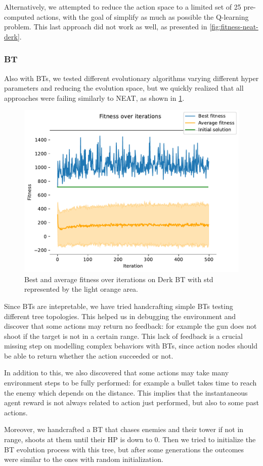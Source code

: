 Alternatively, we attempted to reduce the action space to a limited set of 25 pre-computed actions, with the goal of simplify as much as possible the Q-learning problem. This last approach did not work as well, as presented in \cref{fig:fitness-neat-derk}.


\subsubsection{BT}
Also with BTs, we tested different evolutionary algorithms varying different hyper parameters and reducing the evolution space, but we quickly realized that all approaches were failing similarly to NEAT, as shown in \cref{fig:fitness-bt-derk}.

\begin{figure}
    \centering
    \includegraphics[width=0.8\linewidth]{./images/fitness_over_iterations_derk_bt.pdf}
    \caption{Best and average fitness over iterations on Derk BT with std represented by the light orange area.}
    \label{fig:fitness-bt-derk}
\end{figure}

Since BTs are intepretable, we have tried handcrafting simple BTs testing different tree topologies. This helped us in debugging the environment and discover that some actions may return no feedback: for example the gun does not shoot if the target is not in a certain range. This lack of feedback is a crucial missing step on modelling complex behaviors with BTs, since action nodes should be able to return whether the action succeeded or not.

In addition to this, we also discovered that some actions may take many environment steps to be fully performed: for example a bullet takes time to reach the enemy which depends on the distance.
This implies that the instantaneous agent reward is not always related to action just performed, but also to some past actions.

Moreover, we handcrafted a BT that chases enemies and their tower if not in range, shoots at them until their HP is down to 0. Then we tried to initialize the BT evolution process with this tree, but after some generations the outcomes were similar to the ones with random initialization.
